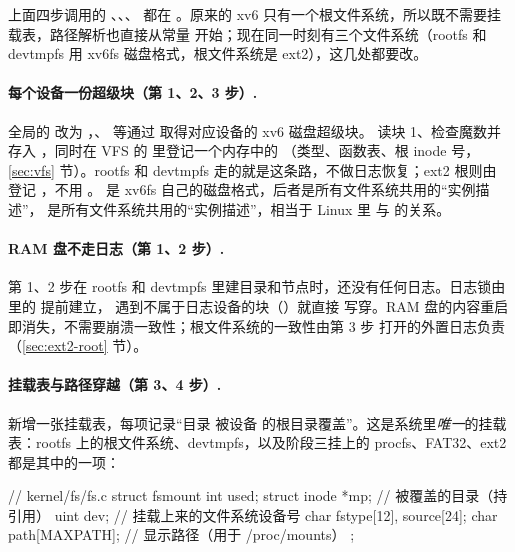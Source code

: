 上面四步调用的 、、、 都在 。原来的 xv6 只有一个根文件系统，所以既不需要挂载表，路径解析也直接从常量  开始；现在同一时刻有三个文件系统（rootfs 和 devtmpfs 用 xv6fs 磁盘格式，根文件系统是 ext2），这几处都要改。

\paragraph{每个设备一份超级块（第 1、2、3 步）.} 全局的  改为 ，、 等通过  取得对应设备的 xv6 磁盘超级块。 读块 1、检查魔数并存入 ，同时在 VFS 的  里登记一个内存中的 （类型、函数表、根 inode 号，\ref{sec:vfs} 节）。rootfs 和 devtmpfs 走的就是这条路，不做日志恢复；ext2 根则由  登记 ，不用 。 是 xv6fs 自己的磁盘格式，后者是所有文件系统共用的“实例描述”， 是所有文件系统共用的“实例描述”，相当于 Linux 里  与  的关系。

\paragraph{RAM 盘不走日志（第 1、2 步）.} 第 1、2 步在 rootfs 和 devtmpfs 里建目录和节点时，还没有任何日志。日志锁由  里的  提前建立， 遇到不属于日志设备的块（）就直接  写穿。RAM 盘的内容重启即消失，不需要崩溃一致性；根文件系统的一致性由第 3 步  打开的外置日志负责（\ref{sec:ext2-root} 节）。

\paragraph{挂载表与路径穿越（第 3、4 步）.}  新增一张挂载表，每项记录“目录  被设备  的根目录覆盖”。这是系统里\emph{唯一}的挂载表：rootfs 上的根文件系统、devtmpfs，以及阶段三挂上的 procfs、FAT32、ext2 都是其中的一项：

\begin{ccode}
// kernel/fs/fs.c
struct fsmount {
  int          used;
  struct inode *mp;           // 被覆盖的目录（持引用）
  uint         dev;           // 挂载上来的文件系统设备号
  char         fstype[12], source[24];
  char         path[MAXPATH]; // 显示路径（用于 /proc/mounts）
};
\end{ccode}

